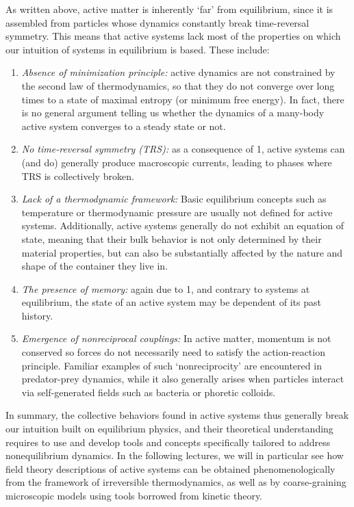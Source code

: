 As written above, active matter is inherently `far' from equilibrium, since it is assembled from particles whose dynamics constantly break time-reversal symmetry. This means that active systems lack most of the properties on which our intuition of systems in equilibrium is based. These include:
%
\begin{enumerate}
    \item \textit{Absence of minimization principle:} active dynamics are not constrained by the second law of thermodynamics, so that they do not converge over long times to a state of maximal entropy (or minimum free energy). In fact, there is no general argument telling us whether the dynamics of a many-body active system converges to a steady state or not.
    \item \textit{No time-reversal symmetry (TRS):} as a consequence of 1, active systems can (and do) generally produce macroscopic currents, leading to phases where TRS is collectively broken.
    \item \textit{Lack of a thermodynamic framework:} Basic equilibrium concepts such as temperature or thermodynamic pressure are usually not defined for active systems. Additionally, active systems generally do not exhibit an equation of state, meaning that their bulk behavior is not only determined by their material properties, but can also be substantially affected by the nature and shape of the container they live in.
    \item \textit{The presence of memory:} again due to 1, and contrary to systems at equilibrium, the state of an active system may be dependent of its past history.
    \item \textit{Emergence of nonreciprocal couplings:} In active matter, momentum is not conserved so forces do not necessarily need to satisfy the action-reaction principle. Familiar examples of such `nonreciprocity' are encountered in predator-prey dynamics, while it also generally arises when particles interact via self-generated fields such as bacteria or phoretic colloids.
\end{enumerate}
%
In summary, the collective behaviors found in active systems thus generally break our intuition built on equilibrium physics, and their theoretical understanding requires to use and develop tools and concepts specifically tailored to address nonequilibrium dynamics.
In the following lectures, we will in particular see how field theory descriptions of active systems can be obtained phenomenologically from the framework of irreversible thermodynamics, as well as by coarse-graining microscopic models using tools borrowed from kinetic theory.


